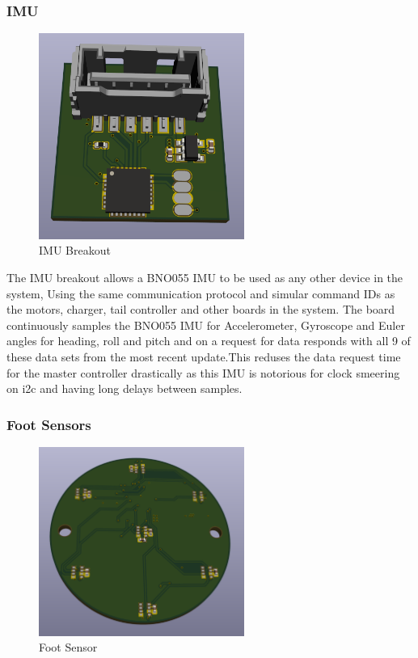 \subsubsection{IMU}
\begin{figure}[H]
       \centering
       \includegraphics[width=0.6\textwidth]{figures/IMU.png}
       \caption{IMU Breakout}
       \label{fig:IMUPCB}
   \end{figure}
   The IMU breakout allows a BNO055 IMU to be used as any other device in the system, Using the same communication protocol and simular command IDs as the motors, charger, tail controller and other boards in the system. The board continuously samples the BNO055 IMU for Accelerometer, Gyroscope and Euler angles for heading, roll and pitch and on a request for data responds with all 9 of these data sets from the most recent update.This reduses the data request time for the master controller drastically as this IMU is notorious for clock smeering on i2c and having long delays between samples.
   
\subsubsection{Foot Sensors}
\begin{figure}[H]
       \centering
       \includegraphics[width=0.6\textwidth]{figures/FootSensor.png}
       \caption{Foot Sensor}
       \label{fig:FootSensorPCB}
   \end{figure}
